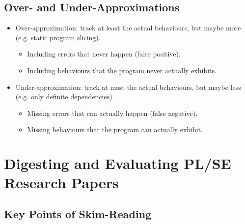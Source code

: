 \documentclass{article}
\begin{document}
\subsection{Over- and Under-Approximations}

\begin{itemize}
    \item Over-approximation: track at least the actual behaviours, but maybe more (e.g. static program slicing).
    \begin{itemize}
        \item Including errors that never happen (false positive).
        \item Including behaviours that the program never actually exhibits.
    \end{itemize}
    \item Under-approximation: track at most the actual behaviours, but maybe less (e.g. only definite dependencies).
    \begin{itemize}
        \item Missing errors that can actually happen (false negative).
        \item Missing behaviours that the program can actually exhibit.
    \end{itemize}
\end{itemize}

\section{Digesting and Evaluating PL/SE Research Papers}

\subsection{Key Points of Skim-Reading}
\end{document}
